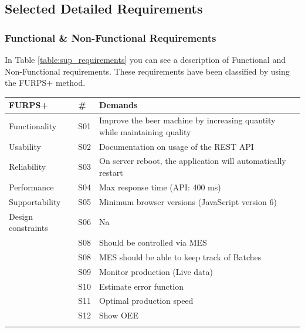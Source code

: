 \subsection{Selected Detailed Requirements}

\subsubsection{Functional \& Non-Functional Requirements}
In Table \ref{table:sup_requirements} you can see a description of Functional and
Non-Functional requirements. These requirements have been classified by using
the FURPS+ method.

\begin{table}[H]
    \begin{tabularx}{\textwidth}{|>{\RaggedRight}p{5.25cm}|>{\RaggedRight}p{0.6cm}|>{\RaggedRight}X|}
        \hline
        \textbf{FURPS+}  & \textbf{\#} & \textbf{Demands} \\
        \hline
        Functionality  	& S01 & Improve the beer machine by increasing quantity while maintaining quality \\
        \hline
        Usability      	& S02 & Documentation on usage of the REST API \\
        \hline
        Reliability    	& S03 & On server reboot, the application will automatically restart \\
        \hline
        Performance    	& S04 & Max response time (API: 400 ms) \\
        \hline
        Supportability 	& S05 & Minimum browser versions (JavaScript version 6)\\
        \hline
        Design constraints 	& S06 & Na \\
        \hline
        \multirow{5}{*}{Implementation requirements} & S08 & Should be controlled via MES\\
        \cline{2-3}
                & S08 & MES should be able to keep track of Batches\\
        \cline{2-3}
                & S09 & Monitor production (Live data)\\
        \cline{2-3}
                & S10 & Estimate error function\\
        \cline{2-3}
                & S11 & Optimal production speed\\
        \hline
        \multirow{14}{*}{Interface requirements } & S12 & Show OEE \\
        \cline{2-3}

\end{tabularx}
\end{table}
